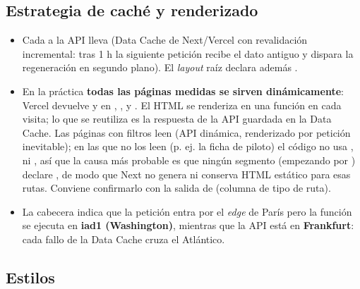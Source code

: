 \subsection{Estrategia de caché y renderizado}

\begin{itemize}
\item Cada  a la API lleva  (Data Cache de Next/Vercel con revalidación incremental: tras 1 h la siguiente petición recibe el dato antiguo y dispara la regeneración en segundo plano). El \emph{layout} raíz declara además .
\item En la práctica \textbf{todas las páginas medidas se sirven dinámicamente}: Vercel devuelve  y  en , ,  y . El HTML se renderiza en una función en cada visita; lo que se reutiliza es la respuesta de la API guardada en la Data Cache. Las páginas con filtros leen  (API dinámica, renderizado por petición inevitable); en las que no los leen (p. ej. la ficha de piloto) el código no usa ,  ni , así que la causa más probable es que ningún segmento (empezando por \code{[lang]}) declare , de modo que Next no genera ni conserva HTML estático para esas rutas. Conviene confirmarlo con la salida de  (columna de tipo de ruta).
\item La cabecera  indica que la petición entra por el \emph{edge} de París pero la función se ejecuta en \textbf{iad1 (Washington)}, mientras que la API está en \textbf{Frankfurt}: cada fallo de la Data Cache cruza el Atlántico.
\end{itemize}

\subsection{Estilos}

